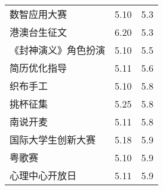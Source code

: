 \documentclass[letterpaper, 12pt]{article}
\begin{document}
\begin{multicols}{2}
{\begin{longtable}{|>{\centering\arraybackslash}m{}|m{}|m{}|}
    数智应用大赛 & 5.10 & 5.3\\
    港澳台生征文 & 6.20 & 5.3\\
    《封神演义》角色扮演 & 5.10 & 5.5\\
    简历优化指导 & 5.11 & 5.6\\
    织布手工 & 5.10 & 5.8\\
    挑杯征集 & 5.25 & 5.8\\
    南说开麦 & 5.11 & 5.8\\
    国际大学生创新大赛 & 5.18 & 5.9\\
    粤歌赛 & 5.10 & 5.9\\
    心理中心开放日 & 5.11 & 5.9\\
    \hline
\end{longtable}
\unskip
\unpenalty
\unpenalty}\unvbox\colbbox
\end{multicols}
\end{document}
